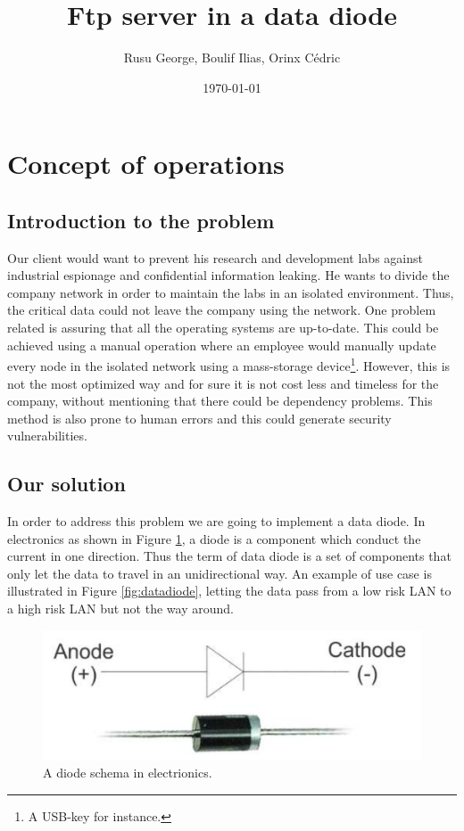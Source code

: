\documentclass[a4paper,10pt]{article}
\title{Ftp server in a data diode}
\author{Rusu George, Boulif Ilias, Orinx Cédric}
\date{\today}
\begin{document}
\maketitle
\newpage
\tableofcontents
\newpage
\section{Concept of operations}
\subsection{Introduction to the problem}
Our client would want to prevent his research and development labs against industrial espionage and confidential information leaking. He wants to divide the company network in order to maintain the labs in an isolated environment. Thus, the critical data could not leave the company using the network. One problem related is assuring that all the operating systems are up-to-date. This could be achieved using a manual operation where an employee would manually update every node in the isolated network using a mass-storage device\footnote{A USB-key for instance.}. However, this is not the most optimized way and for sure it is not cost less and timeless for the company, without mentioning that there could be dependency problems. This method is also prone to human errors and this could generate security vulnerabilities.

\subsection{Our solution}
In order to address this problem we are going to implement a data diode. In electronics as shown in Figure \ref{fig:diode}, a diode is a component which conduct the current in one direction. Thus the term of data diode is a set of components that only let the data to travel in an unidirectional way. An example of use case is illustrated in Figure \ref{fig:datadiode}, letting the data pass from a low risk LAN to a high risk LAN but not the way around.
\begin{figure}
\centering
\includegraphics[scale=0.25]{images/diode.png}
\caption{A diode schema in electrionics.}
\label{fig:diode}
\end{figure}
\end{document}
